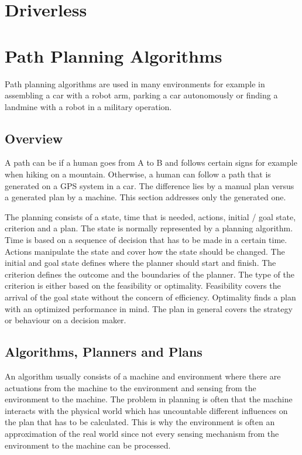 \section{Driverless}
\lipsum[1]

\section{Path Planning Algorithms}
Path planning algorithms are used in many environments for example in assembling a car with a robot arm, parking a car autonomously or finding a landmine with a robot in a military operation. 

\subsection{Overview}
A path can be if a human goes from A to B and follows certain signs for example when hiking on a mountain. Otherwise, a human can follow a path that is generated on a GPS system in a car. The difference lies by a manual plan versus a generated plan by a machine. This section addresses only the generated one.

The planning consists of a state, time that is needed, actions, initial / goal state, criterion and a plan. The state is normally represented by a planning algorithm. Time is based on a sequence of decision that has to be made in a certain time. Actions manipulate the state and cover how the state should be changed. The initial and goal state defines where the planner should start and finish.
The criterion defines the outcome and the boundaries of the planner. The type of the criterion is either based on the feasibility or optimality. Feasibility covers the arrival of the goal state without the concern of efficiency. Optimality finds a plan with an optimized performance in mind. The plan in general covers the strategy or behaviour on a decision maker.
\cite{planning_algorithms_steven_m_lavalle}

\subsection{Algorithms, Planners and Plans}
An algorithm usually consists of a machine and environment where there are actuations from the machine to the environment and sensing from the environment to the machine. The problem in planning is often that the machine interacts with the physical world which has uncountable different influences on the plan that has to be calculated. This is why the environment is often an approximation of the real world since not every sensing mechanism from the environment to the machine can be processed.

